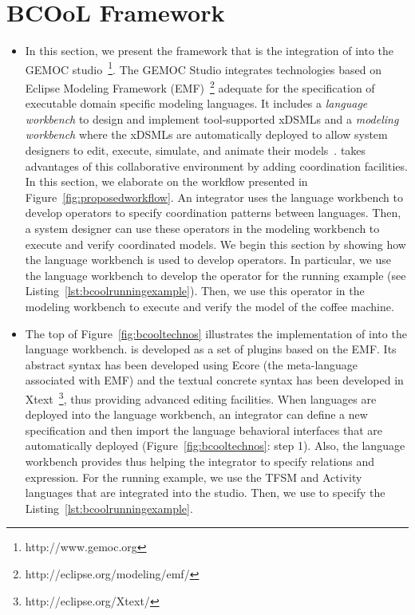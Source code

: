 \section{BCOoL Framework}
\label{section:bcoollengbench}
\begin{itemize}

	\item In this section, we present the \bcool framework that is the integration of \bcool into the GEMOC studio~\footnote{http://www.gemoc.org}. The GEMOC Studio integrates technologies based on Eclipse Modeling Framework (EMF)~\footnote{http://eclipse.org/modeling/emf/} adequate for the specification of executable domain specific modeling languages. It includes a \emph{language workbench} to design and implement tool-supported xDSMLs and a \emph{modeling workbench} where the xDSMLs are automatically deployed to allow system designers to edit, execute, simulate, and animate their models~\cite{ttc15bib}. \bcool takes advantages of this collaborative environment by adding coordination facilities. In this section, we elaborate on the workflow presented in Figure~\ref{fig:proposedworkflow}. An integrator uses the language workbench to develop \bcool operators to specify coordination patterns between languages. Then, a system designer can use these operators in the modeling workbench to execute and verify coordinated models. We begin this section by showing how the language workbench is used to develop \bcool operators. In particular, we use the language workbench to develop the operator for the running example (see Listing~\ref{lst:bcoolrunningexample}). Then, we use this operator in the modeling workbench to execute and verify the model of the coffee machine. 

	\item The top of Figure~\ref{fig:bcooltechnos} illustrates the implementation of \bcool into the language workbench. \bcool is developed as a set of plugins based on the EMF. Its abstract syntax has been developed using Ecore (\ie the meta-language associated with EMF) and the textual concrete syntax has been developed in Xtext~\footnote{http://eclipse.org/Xtext/}, thus providing advanced editing facilities. When languages are deployed into the language workbench, an integrator can define a new \bcool specification and then import the language behavioral interfaces that are automatically deployed (Figure~\ref{fig:bcooltechnos}: step 1). Also, the language workbench provides \moccml thus helping the integrator to specify relations and expression. For the running example, we use the TFSM and Activity languages that are integrated into the studio. Then, we use \bcool to specify the Listing~\ref{lst:bcoolrunningexample}.   
	

\end{itemize}

